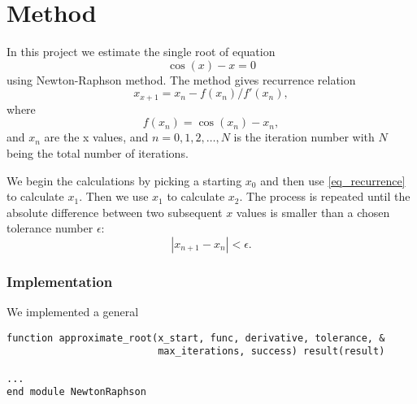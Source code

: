 \part{Method}

In this project we estimate the single root of equation
\[
  \cos(x) - x = 0
\]
using Newton-Raphson method. The method gives recurrence relation
\begin{equation}
  x_{x+1} = x_n - f(x_n) / f'(x_n),
  \label{eq_recurrence}
\end{equation}
where
\[
  f(x_n) = \cos(x_n) - x_n,
\]
and $x_n$ are the x values, and $n = 0, 1, 2, \dots, N$ is the iteration number with $N$ being the total number of iterations. 

We begin the calculations by picking a starting $x_0$ and then use \autoref{eq_recurrence} to calculate $x_1$. Then we use $x_1$ to calculate $x_2$. The process is repeated until the absolute difference between two subsequent $x$ values is smaller than a chosen tolerance number $\epsilon$:
\[
  |{x_{n+1} - x_n}| < \epsilon.
\]

\section{Implementation}

We implemented a general

\noindent\begin{minipage}{\linewidth}
\begin{lstlisting}[caption={hello},frame=tlrb,label={code_q1_a_integral}]
function approximate_root(x_start, func, derivative, tolerance, &
                          max_iterations, success) result(result)

...
end module NewtonRaphson
\end{lstlisting}
\end{minipage}




